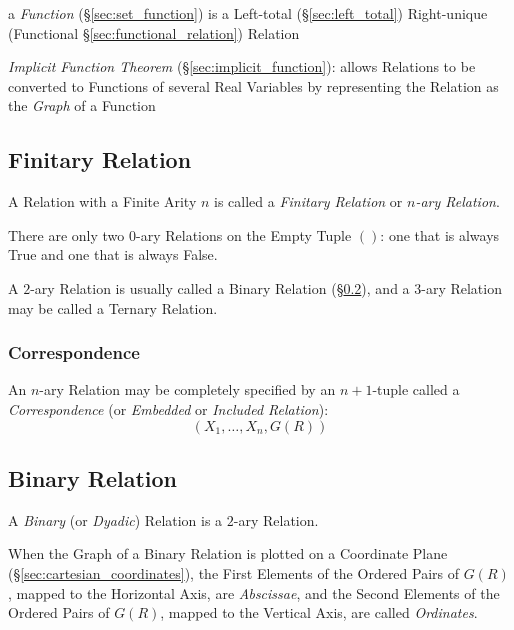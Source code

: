 \fist a \emph{Function} (\S\ref{sec:set_function}) is a Left-total
(\S\ref{sec:left_total}) Right-unique (Functional
\S\ref{sec:functional_relation}) Relation

\fist \emph{Implicit Function Theorem} (\S\ref{sec:implicit_function}): allows
Relations to be converted to Functions of several Real Variables by representing
the Relation as the \emph{Graph} of a Function



\subsection{Finitary Relation}\label{sec:finitary_relation}

A Relation with a Finite Arity $n$ is called a \emph{Finitary
  Relation} or \emph{$n$-ary Relation}.

There are only two $0$-ary Relations on the Empty Tuple $()$: one that
is always True and one that is always False.

A $2$-ary Relation is usually called a Binary Relation
(\S\ref{sec:binary_relation}), and a $3$-ary Relation may be called a
Ternary Relation.



\subsubsection{Correspondence}\label{sec:correspondence}

An $n$-ary Relation may be completely specified by an $n + 1$-tuple
called a \emph{Correspondence} (or \emph{Embedded} or \emph{Included
  Relation}):
\[
  (X_1, \ldots, X_n, G(R))
\]



\subsection{Binary Relation}\label{sec:binary_relation}

A \emph{Binary} (or \emph{Dyadic}) Relation is a $2$-ary Relation.

When the Graph of a Binary Relation is plotted on a Coordinate Plane
(\S\ref{sec:cartesian_coordinates}), the First Elements of the Ordered
Pairs of $G(R)$, mapped to the Horizontal Axis, are \emph{Abscissae},
and the Second Elements of the Ordered Pairs of $G(R)$, mapped to the
Vertical Axis, are called \emph{Ordinates}.

